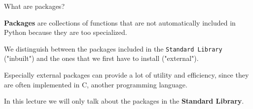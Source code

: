 \begin{frame}[fragile]{What are packages?}

    \textbf{Packages} are collections of functions that are not automatically included in Python because they are too specialized.

    \vspace{1em}

    We distinguish between the packages included in the \texttt{Standard Library} ("inbuilt") and the ones that we first have to install ("external").

    \vspace{1em}

    Especially external packages can provide a lot of utility and efficiency, since they are often implemented in C, another programming language.

    \vspace{1em}

    In this lecture we will only talk about the packages in the \textbf{Standard Library}.


\end{frame}



